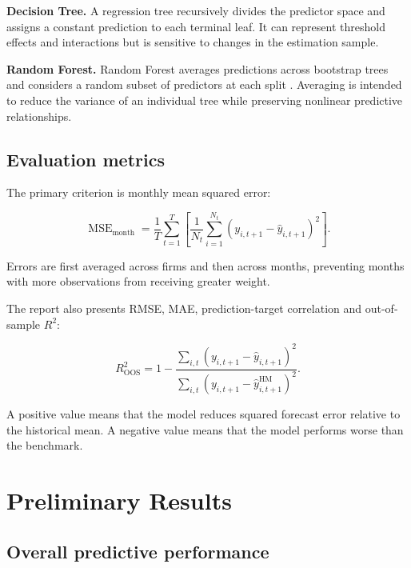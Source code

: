 \documentclass[11pt,a4paper]{article}
\begin{document}
\textbf{Decision Tree.}
A regression tree recursively divides the predictor space and assigns a
constant prediction to each terminal leaf. It can represent threshold effects
and interactions but is sensitive to changes in the estimation sample.

\textbf{Random Forest.}
Random Forest averages predictions across bootstrap trees and considers a
random subset of predictors at each split \parencite{breiman2001random}.
Averaging is intended to reduce the variance of an individual tree while
preserving nonlinear predictive relationships.

\subsection{Evaluation metrics}

The primary criterion is monthly mean squared error:

\begin{equation}
 \operatorname{MSE}_{\mathrm{month}}
 =
 \frac{1}{T}
 \sum_{t=1}^{T}
 \left[
 \frac{1}{N_t}
 \sum_{i=1}^{N_t}
 \left(
 y_{i,t+1}
 -
 \widehat{y}_{i,t+1}
 \right)^2
 \right].
 \label{eq:monthly-mse}
\end{equation}

Errors are first averaged across firms and then across months, preventing months
with more observations from receiving greater weight.

The report also presents RMSE, MAE, prediction-target correlation and
out-of-sample \(R^2\):

\begin{equation}
 R^2_{\mathrm{OOS}}
 =
 1
 -
 \frac{
   \sum_{i,t}
   (y_{i,t+1}-\widehat y_{i,t+1})^2
 }{
   \sum_{i,t}
   (y_{i,t+1}-\widehat y^{\mathrm{HM}}_{i,t+1})^2
 }.
 \label{eq:oos-r2}
\end{equation}

A positive value means that the model reduces squared forecast error relative
to the historical mean. A negative value means that the model performs worse
than the benchmark.


\section{Preliminary Results}
\label{sec:results}

\subsection{Overall predictive performance}
\end{document}
